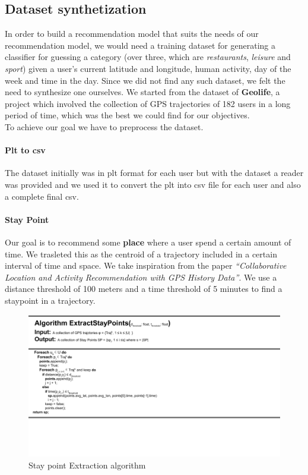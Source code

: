 \documentclass[../../main]{subfiles}
\begin{document}
\subsection{Dataset synthetization}
\label{ss:dataset-synthetization}

In order to build a recommendation model that suits the needs of our recommendation model, we would need a training dataset for generating a classifier for guessing a category 
(over three, which are \textit{restaurants}, \textit{leisure} and \textit{sport}) given a user's current latitude and longitude, human activity, day of the week and time in the day.
Since we did not find any such dataset, we felt the need to synthesize one ourselves.
We started from the dataset of \textbf{Geolife}, a project which involved the collection of GPS trajectories of 182 users in a long period of time, which was the best we could find for our objectives.\\
To achieve our goal we have to preprocess the dataset.

\paragraph*{Plt to csv}
The dataset initially was in plt format for each user but with the dataset a reader was provided and we used it to convert the plt into csv file for each user
and also a complete final csv.
\paragraph{Stay Point}
Our goal is to recommend some \textbf{place} where a user spend a certain amount of time. We trasleted this as the centroid
of a trajectory included in a certain interval of time and space. We take inspiration from the paper 
\textit{``Collaborative Location and Activity Recommendation with GPS History Data''}. 
We use a distance threshold of 100 meters and a time threshold of 5 minutes to find a staypoint in a trajectory.
\begin{figure}[h]
    \centering
    \includegraphics{images/sp.png}
    \caption{Stay point Extraction algorithm}\label{fig:extraction_sp}
\end{figure}
\end{document}
